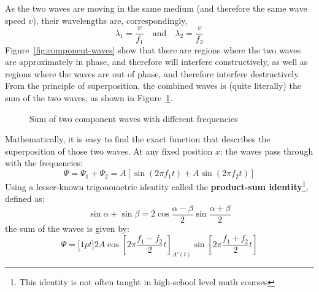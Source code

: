 As the two waves are moving in the same medium (and therefore the same wave
speed $v$), their wavelengths are, correspondingly,
\begin{equation*}
  \lambda_1=\frac v{f_1}\quad\text{and}\quad\lambda_2=\frac v{f_2}
\end{equation*}
Figure~\ref{fig:component-waves} show that there are regions where the two waves
are approximately in phase, and therefore will interfere constructively, as
well as regions where the waves are out of phase, and therefore interfere
destructively. From the principle of superposition, the combined waves is
(quite literally) the sum of the two waves, as shown in Figure~\ref{fig:sum}.
\begin{figure}[ht]
  \centering
  \caption{Sum of two component waves with different frequencies}
  \label{fig:sum}
\end{figure}
Mathematically, it is easy to find the exact function that describes the
superposition of those two waves. At any fixed position $x$: the waves pass
through with the frequencies:
\begin{equation}
  \Psi = \Psi_1 + \Psi_2 = A\left[\sin(2\pi f_1t)+A\sin(2\pi f_2t)\right]
\end{equation}
Using a lesser-known trigonometric identity called the \textbf{product-sum
  identity}\footnote{This identity is not often taught in high-school level
math courses}, defined as: %
\begin{equation}
  \sin\alpha+\sin\beta=2\cos\frac{\alpha-\beta}2\sin\frac{\alpha+\beta}2
\end{equation}
the sum of the waves is given by:
\begin{equation}
  \Psi = \underbracket[1pt]{2A\cos\left[2\pi\frac{f_1-f_2}2t\right]}_{A'(t)}
  \sin\left[2\pi\frac{f_1+f_2}2t\right]
  \label{eq:sum}
\end{equation}
